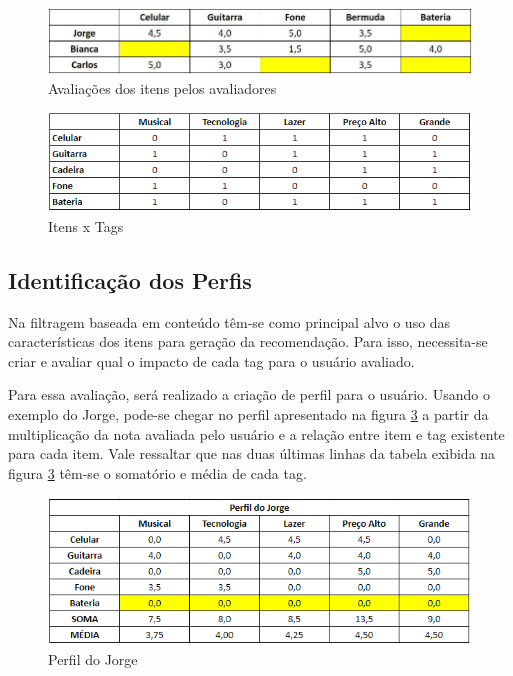 \begin{figure}[H]
	\centering
	\includegraphics[width=.8\linewidth]{imagens/recomendacaoAvaliacoes.jpg}
	\caption[Avaliações dos itens pelos avaliadores]{Avaliações dos itens pelos avaliadores}
    \label{fig:avaliacoes2}
\end{figure}

\begin{figure}[H]
	\centering
	\includegraphics[width=.8\linewidth]{imagens/itemTags.PNG}
	\caption[Itens x Tags]{Itens x Tags}
    \label{fig:itensTags}
\end{figure}

\subsection{Identificação dos Perfis}

Na filtragem baseada em conteúdo têm-se como principal alvo o uso das características dos itens para geração da recomendação. Para isso, necessita-se criar e avaliar qual o impacto de cada tag para o usuário avaliado.

Para essa avaliação, será realizado a criação de perfil para o usuário. Usando o exemplo do Jorge, pode-se chegar no perfil apresentado na figura \ref{fig:perfilUsuario} a partir da multiplicação da nota avaliada pelo usuário e a relação entre item e tag existente para cada item. Vale ressaltar que nas duas últimas linhas da tabela exibida na figura \ref{fig:perfilUsuario} têm-se o somatório e média de cada tag.

\begin{figure}[H]
	\centering
	\includegraphics[width=.8\linewidth]{imagens/perfilUsuario.PNG}
	\caption[Perfil do Jorge]{Perfil do Jorge}
    \label{fig:perfilUsuario}
\end{figure}

